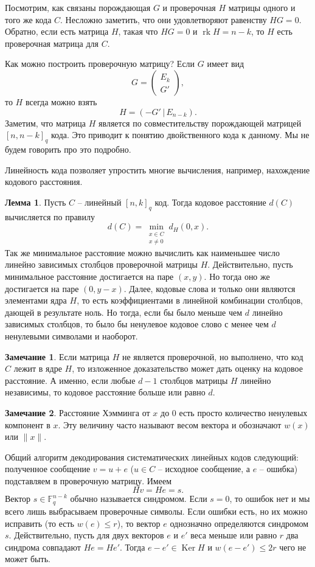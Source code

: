 \documentclass[12pt,a4paper,oneside]{book}
\theoremstyle{definition}
\newtheorem*{rem}{\color{green!50!blue}Замечание}
\newtheorem{lem}{\color{green!50!black}Лемма}
\renewcommand{\leq}{\leqslant}
\newcommand{\rk}{\operatorname{rk}}
\DeclareMathOperator{\Ker}{Ker}
\newcommand{\F}{\mathbb F}
\def\lm{\begin{lem}}
\def\elm{\end{lem}}
\def\rm{\begin{rem}}
\def\erm{\end{rem}}
\def\pmat{\begin{pmatrix}}
\def\epmat{\end{pmatrix}}
\begin{document}
Посмотрим, как связаны порождающая $G$ и проверочная $H$ матрицы одного и того же кода $C$. Несложно заметить, что они удовлетворяют равенству $HG=0$. Обратно, если есть матрица $H$, такая что $HG=0$ и $\rk H=n-k$, то $H$ есть проверочная матрица для $C$.

Как можно построить проверочную матрицу? Если $G$ имеет вид
$$G= \pmat E_k\\ G' \epmat,$$
то $H$ всегда можно взять 
$$H=(-G'\,|\,E_{n-k}).$$
Заметим, что матрица $H$ является по совместительству порождающей матрицей $[n,n-k]_q$ кода. Это приводит к понятию двойственного кода к данному. Мы не будем говорить про это подробно.

Линейность кода позволяет упростить многие вычисления, например, нахождение кодового расстояния.



\lm Пусть $C$ -- линейный $[n,k]_q$ код. Тогда кодовое расстояние $d(C)$ вычисляется по правилу 
$$d(C)=\min_{\substack{x \in C \\ x\neq 0} } d_H(0,x).$$
Так же минимальное расстояние можно вычислить как наименьшее число линейно зависимых столбцов проверочной матрицы $H$.
\proof
Действительно, пусть минимальное расстояние достигается на паре $(x,y)$. Но тогда оно же достигается на паре $(0,y-x)$. Далее, кодовые слова и только они являются элементами ядра $H$, то есть коэффициентами в линейной комбинации столбцов, дающей в результате ноль. Но тогда, если бы было меньше чем $d$ линейно зависимых столбцов, то было бы  ненулевое кодовое слово с менее чем $d$ ненулевыми символами и наоборот. 
\endproof
\elm

\rm Если матрица $H$ не является проверочной, но выполнено, что код $C$ лежит в ядре $H$, то изложенное доказательство может дать оценку на кодовое расстояние. А именно, если любые $d-1$ столбцов матрицы $H$ линейно независимы, то кодовое расстояние больше или равно $d$. 
\erm 

\rm Расстояние Хэмминга от $x$ до $0$ есть просто количество ненулевых компонент в $x$. Эту величину часто называют весом вектора и обозначают $w(x)$ или $\|x\|$.
\erm 

Общий алгоритм декодирования систематических линейных кодов следующий: полученное сообщение $v= u+e$ ($u\in C$ -- исходное сообщение, а $e$ -- ошибка) подставляем в проверочную матрицу. Имеем 
$$Hv= He=s.$$
Вектор $s\in \F_q^{n-k}$ обычно называется синдромом. Если $s=0$, то ошибок нет и мы всего лишь выбрасываем проверочные символы. Если ошибки есть, но их можно исправить (то есть $w(e)\leq r$), то вектор $e$ однозначно определяются синдромом $s$. Действительно, пусть для двух векторов $e$ и $e'$ веса меньше или равно $r$ два синдрома совпадают $He=He'$. Тогда $e-e'\in \Ker H$ и $w(e-e')\leq 2r$ чего не может быть.
\end{document}

